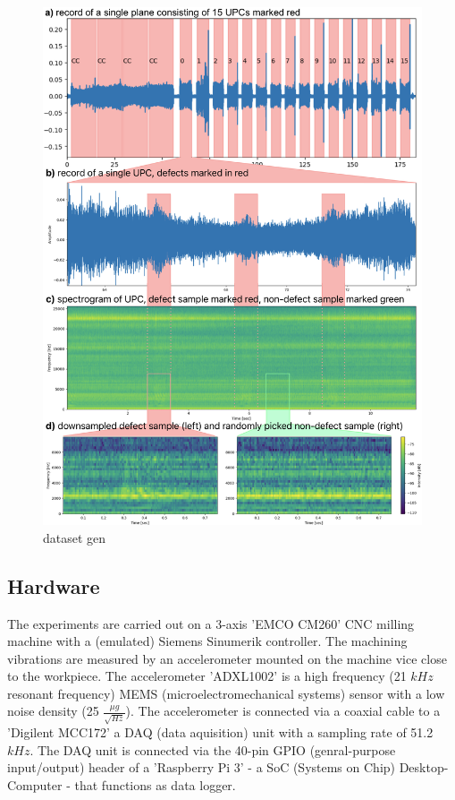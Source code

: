 \documentclass[5p,times,procedia]{elsarticle}
\begin{document}
\begin{figure}[t]
    \centering
    \includegraphics[width=0.99\linewidth]{dataset_gen.png}
    \caption{dataset gen}
    \label{dataset_gen}
\end{figure}

\subsection{Hardware}
\vspace*{-\baselineskip}
The experiments are carried out on a 3-axis 'EMCO CM260' CNC milling machine with a (emulated) Siemens Sinumerik controller. The machining vibrations are measured by an accelerometer mounted on the machine vice close to the workpiece. The accelerometer 'ADXL1002' is a high frequency (21 $kHz$ resonant frequency) MEMS (microelectromechanical systems) sensor with a low noise density (25 $\frac{\mu g}{\sqrt{Hz}}$). The accelerometer is connected via a coaxial cable to a 'Digilent MCC172' a DAQ (data aquisition) unit with a sampling rate of 51.2 $kHz$.
The DAQ unit is connected via the 40-pin GPIO (genral-purpose input/output) header of a 'Raspberry Pi 3' - a SoC (Systems on Chip) Desktop-Computer - that functions as data logger.
\end{document}
